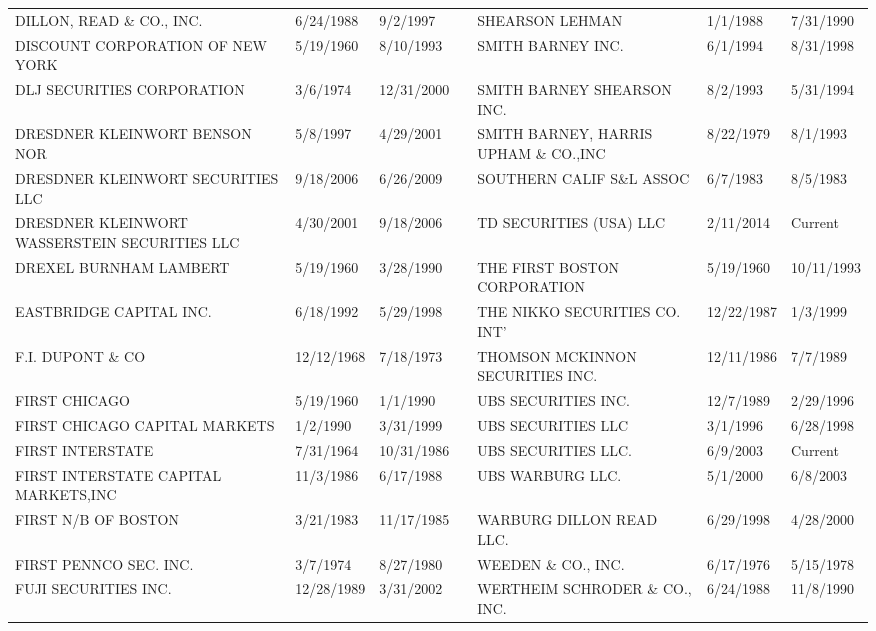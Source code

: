 \documentclass{article}
\begin{document}
\begin{tabular}{lllllll}
DILLON, READ \& CO., INC.            & 6/24/1988 & 9/2/1997 &  & SHEARSON LEHMAN                      & 1/1/1988 & 7/31/1990 \\
DISCOUNT CORPORATION OF NEW YORK     & 5/19/1960 & 8/10/1993 &  & SMITH BARNEY INC.                    & 6/1/1994 & 8/31/1998 \\
DLJ SECURITIES CORPORATION          & 3/6/1974 & 12/31/2000 &  & SMITH BARNEY SHEARSON INC.           & 8/2/1993 & 5/31/1994 \\
DRESDNER KLEINWORT BENSON NOR   & 5/8/1997 & 4/29/2001 &  & SMITH BARNEY, HARRIS UPHAM \& CO.,INC & 8/22/1979 & 8/1/1993 \\
DRESDNER KLEINWORT SECURITIES LLC & 9/18/2006 & 6/26/2009 &  & SOUTHERN CALIF S\&L ASSOC            & 6/7/1983 & 8/5/1983 \\
DRESDNER KLEINWORT WASSERSTEIN SECURITIES LLC & 4/30/2001 & 9/18/2006 &  & TD SECURITIES (USA) LLC & 2/11/2014 & Current \\
DREXEL BURNHAM LAMBERT              & 5/19/1960 & 3/28/1990 &  & THE FIRST BOSTON CORPORATION        & 5/19/1960 & 10/11/1993 \\
EASTBRIDGE CAPITAL INC.              & 6/18/1992 & 5/29/1998 &  & THE NIKKO SECURITIES CO. INT'       & 12/22/1987 & 1/3/1999 \\
F.I. DUPONT \& CO                     & 12/12/1968 & 7/18/1973 &  & THOMSON MCKINNON SECURITIES INC.    & 12/11/1986 & 7/7/1989 \\
FIRST CHICAGO                       & 5/19/1960 & 1/1/1990 &  & UBS SECURITIES INC.                 & 12/7/1989 & 2/29/1996 \\
FIRST CHICAGO CAPITAL MARKETS       & 1/2/1990 & 3/31/1999 &  & UBS SECURITIES LLC                  & 3/1/1996 & 6/28/1998 \\
FIRST INTERSTATE                     & 7/31/1964 & 10/31/1986 &  & UBS SECURITIES LLC.                 & 6/9/2003 & Current \\
FIRST INTERSTATE CAPITAL MARKETS,INC & 11/3/1986 & 6/17/1988 &  & UBS WARBURG LLC.                    & 5/1/2000 & 6/8/2003 \\
FIRST N/B OF BOSTON                  & 3/21/1983 & 11/17/1985 &  & WARBURG DILLON READ LLC.            & 6/29/1998 & 4/28/2000 \\
FIRST PENNCO SEC. INC.               & 3/7/1974 & 8/27/1980 &  & WEEDEN \& CO., INC.                   & 6/17/1976 & 5/15/1978 \\
FUJI SECURITIES INC.                & 12/28/1989 & 3/31/2002 &  & WERTHEIM SCHRODER \& CO., INC.        & 6/24/1988 & 11/8/1990 \\

\end{tabular}
\end{document}
